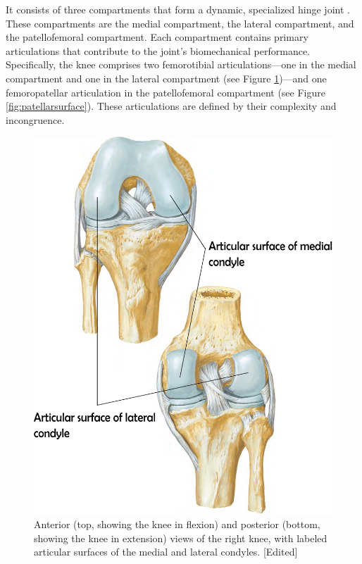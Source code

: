 \documentclass{micro-econ-thesis}
\begin{document}
 
It consists of three compartments that form a dynamic, specialized hinge joint \parencite[p.1395]{standring_grays_2021}. These compartments are the medial compartment, the lateral compartment, and the patellofemoral compartment.
Each compartment contains primary articulations that contribute to the joint's biomechanical performance. Specifically, the knee comprises two femorotibial articulations—one in the medial compartment and one in the lateral compartment (see Figure \ref{fig:rightkneeplate519})—and one femoropatellar articulation in the patellofemoral compartment (see Figure \ref{fig:patellarsurface}). These articulations are defined by their complexity and incongruence. 
 
\begin{figure}[H]
	\centering
	\includegraphics[scale=0.3]{right_knee_labeled}
	\caption{Anterior (top, showing the knee in flexion) and posterior (bottom, showing the knee in extension) views of the right knee, with labeled articular surfaces of the medial and lateral condyles. [Edited] \parencite[p.519]{netter_519_2023}}
	\label{fig:rightkneeplate519}
\end{figure}
\end{document}
